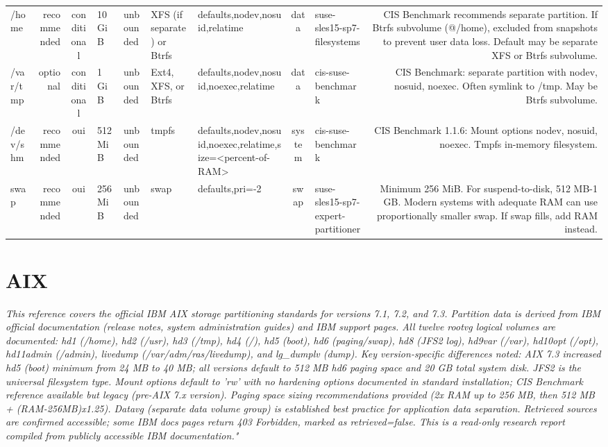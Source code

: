 \documentclass[10pt,a4paper]{article}
\begin{document}
{\begin{longtable}{M R S Z Z T O C I N}
/home & \textcolor{cHigh}{recommended} & conditional & 10 GiB & unbounded & XFS (if separate) or Btrfs & defaults,nodev,nosuid,relatime & data & suse-sles15-sp7-filesystems & CIS Benchmark recommends separate partition. If Btrfs subvolume (@/home), excluded from snapshots to prevent user data loss. Default may be separate XFS or Btrfs subvolume.\\
/var/tmp & \textcolor{cLow}{optional} & conditional & 1 GiB & unbounded & Ext4, XFS, or Btrfs & defaults,nodev,nosuid,noexec,relatime & data & cis-suse-benchmark & CIS Benchmark: separate partition with nodev, nosuid, noexec. Often symlink to /tmp. May be Btrfs subvolume.\\
/dev/shm & \textcolor{cHigh}{recommended} & \textcolor{cOk}{oui} & 512 MiB & unbounded & tmpfs & defaults,nodev,nosuid,noexec,relatime,size=<percent-of-RAM> & system & cis-suse-benchmark & CIS Benchmark 1.1.6: Mount options nodev, nosuid, noexec. Tmpfs in-memory filesystem.\\
swap & \textcolor{cHigh}{recommended} & \textcolor{cOk}{oui} & 256 MiB & unbounded & swap & defaults,pri=-2 & swap & suse-sles15-sp7-expert-partitioner & Minimum 256 MiB. For suspend-to-disk, 512 MB-1 GB. Modern systems with adequate RAM can use proportionally smaller swap. If swap fills, add RAM instead.\\
\bottomrule\end{longtable}}
\clearpage
\section{AIX}
\noindent\small\textit{This reference covers the official IBM AIX storage partitioning standards for versions 7.1, 7.2, and 7.3. Partition data is derived from IBM official documentation (release notes, system administration guides) and IBM support pages. All twelve rootvg logical volumes are documented: hd1 (/home), hd2 (/usr), hd3 (/tmp), hd4 (/), hd5 (boot), hd6 (paging/swap), hd8 (JFS2 log), hd9var (/var), hd10opt (/opt), hd11admin (/admin), livedump (/var/adm/ras/livedump), and lg\_dumplv (dump). Key version-specific differences noted: AIX 7.3 increased hd5 (boot) minimum from 24 MB to 40 MB; all versions default to 512 MB hd6 paging space and 20 GB total system disk. JFS2 is the universal filesystem type. Mount options default to 'rw' with no hardening options documented in standard installation; CIS Benchmark reference available but legacy (pre-AIX 7.x version). Paging space sizing recommendations provided (2x RAM up to 256 MB, then 512 MB + (RAM-256MB)x1.25). Datavg (separate data volume group) is established best practice for application data separation. Retrieved sources are confirmed accessible; some IBM docs pages return 403 Forbidden, marked as retrieved=false. This is a read-only research report compiled from publicly accessible IBM documentation."
}\normalsize\par\medskip
\end{document}
